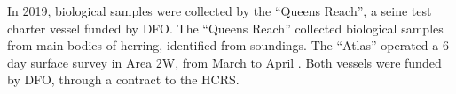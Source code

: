 In 2019, biological samples were collected by the ``Queens Reach'', a seine test charter vessel funded by DFO.
The ``Queens Reach'' collected biological samples from main bodies of herring, identiﬁed from soundings.
The ``Atlas'' operated a 6 day surface survey in Area 2W, from March  to April .
Both vessels were funded by DFO, through a contract to the HCRS.